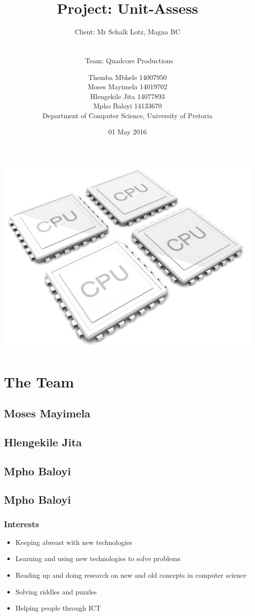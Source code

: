 \documentclass{scrartcl}
\title{Project: Unit-Assess}
\subtitle{Client: Mr Schalk Lotz, Magna BC \\\\\\\ Team: Quadcore Productions\\}
\author{Themba Mbhele 14007950\\ Moses Mayimela 14019702 \\ Hlengekile Jita 14077893 \\ Mpho Baloyi 14133670 \\Department of Computer Science, University of Pretoria}
\date{01 May 2016}
\begin{document}
\maketitle
\includegraphics[width=\textwidth]{2012-quad-core-phones}
\section{The Team}
\subsection{Moses Mayimela}
\subsection{Hlengekile Jita}
\subsection{Mpho Baloyi}
\subsection{Mpho Baloyi}
\subsubsection{Interests}
\begin{itemize}
\item Keeping abreast with new technologies
\item Learning and using new technologies to solve problems
\item Reading up and doing research on new and old concepts in computer science
\item Solving riddles and puzzles
\item Helping people through ICT
\end{itemize}
\end{document}
